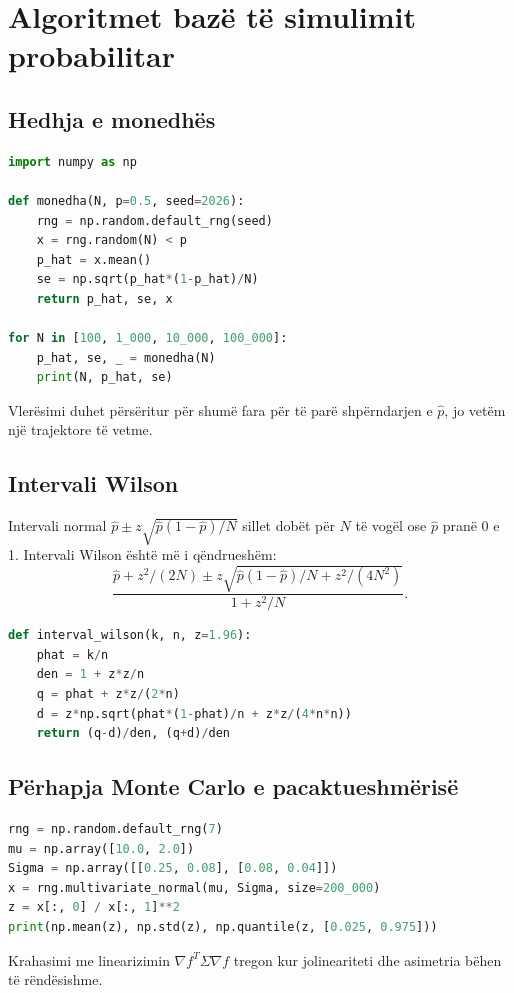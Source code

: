 \section{Algoritmet bazë të simulimit probabilitar}
\subsection{Hedhja e monedhës}
\begin{lstlisting}[language=Python,caption={Vlerësimi i probabilitetit dhe gabimit standard.}]
import numpy as np

def monedha(N, p=0.5, seed=2026):
    rng = np.random.default_rng(seed)
    x = rng.random(N) < p
    p_hat = x.mean()
    se = np.sqrt(p_hat*(1-p_hat)/N)
    return p_hat, se, x

for N in [100, 1_000, 10_000, 100_000]:
    p_hat, se, _ = monedha(N)
    print(N, p_hat, se)
\end{lstlisting}
Vlerësimi duhet përsëritur për shumë fara për të parë shpërndarjen e $\hat p$, jo vetëm një trajektore të vetme.

\subsection{Intervali Wilson}
Intervali normal $\hat p\pm z\sqrt{\hat p(1-\hat p)/N}$ sillet dobët për $N$ të vogël ose $\hat p$ pranë 0 e 1. Intervali Wilson është më i qëndrueshëm:
\begin{equation}
 \frac{\hat p+z^2/(2N)\pm z\sqrt{\hat p(1-\hat p)/N+z^2/(4N^2)}}{1+z^2/N}.
\end{equation}

\begin{lstlisting}[language=Python]
def interval_wilson(k, n, z=1.96):
    phat = k/n
    den = 1 + z*z/n
    q = phat + z*z/(2*n)
    d = z*np.sqrt(phat*(1-phat)/n + z*z/(4*n*n))
    return (q-d)/den, (q+d)/den
\end{lstlisting}

\subsection{Përhapja Monte Carlo e pacaktueshmërisë}
\begin{lstlisting}[language=Python,caption={Përhapja e hyrjeve të korreluara.}]
rng = np.random.default_rng(7)
mu = np.array([10.0, 2.0])
Sigma = np.array([[0.25, 0.08], [0.08, 0.04]])
x = rng.multivariate_normal(mu, Sigma, size=200_000)
z = x[:, 0] / x[:, 1]**2
print(np.mean(z), np.std(z), np.quantile(z, [0.025, 0.975]))
\end{lstlisting}
Krahasimi me linearizimin $\nabla f^T\Sigma\nabla f$ tregon kur jolineariteti dhe asimetria bëhen të rëndësishme.

